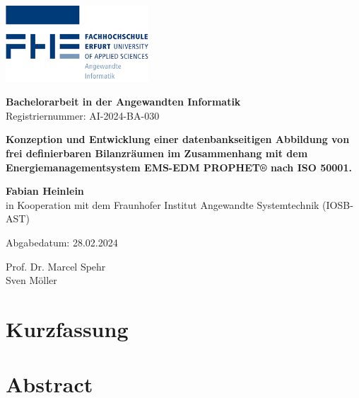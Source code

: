 \documentclass[a4paper,10pt,twoside]{report}
\begin{document}
\begin{titlepage}
  \hspace*{\fill}
  \includegraphics[width=0.4\textwidth,keepaspectratio]{../../Ressourcen/Bilder/FHE-AI_Logo.png}

  \centering
  \vspace*{1cm}

  \vspace{0.5cm}

  {\Huge\textbf{Bachelorarbeit in der Angewandten Informatik}}
  \\
  Registriernummer: AI-2024-BA-030

  \vspace{1.5cm}

  {\large\textbf{Konzeption und Entwicklung einer datenbankseitigen Abbildung von frei definierbaren Bilanzräumen
      im Zusammenhang mit dem Energiemanagementsystem EMS-EDM PROPHET® nach ISO 50001.}}

  \vspace{1.5cm}

  {\Large\textbf{Fabian Heinlein}}
  \\ in Kooperation mit dem Fraunhofer Institut Angewandte Systemtechnik (IOSB-AST)

  \vspace{1cm}

  \Large Abgabedatum: 28.02.2024

  \vspace{1cm}

  Prof. Dr. Marcel Spehr \\
  Sven Möller

  \vfill

\end{titlepage}



\chapter*{Kurzfassung}
\chapter*{Abstract}
\end{document}
